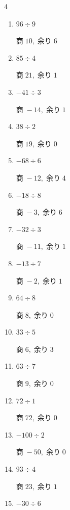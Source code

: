 \begin{multicols}{4}
\begin{enumerate}
        $商\; 0,\; 余り\; 2$

  \item $96 \div 9$

        $商\; 10,\; 余り\; 6$

  \item $85 \div 4$

        $商\; 21,\; 余り\; 1$

  \item $-41 \div 3$

        $商\; -14,\; 余り\; 1$

  \item $38 \div 2$

        $商\; 19,\; 余り\; 0$

  \item $-68 \div 6$

        $商\; -12,\; 余り\; 4$

  \item $-18 \div 8$

        $商\; -3,\; 余り\; 6$

  \item $-32 \div 3$

        $商\; -11,\; 余り\; 1$

  \item $-13 \div 7$

        $商\; -2,\; 余り\; 1$

  \item $64 \div 8$

        $商\; 8,\; 余り\; 0$

  \item $33 \div 5$

        $商\; 6,\; 余り\; 3$

\columnbreak %

  \item $63 \div 7$

        $商\; 9,\; 余り\; 0$

  \item $72 \div 1$

        $商\; 72,\; 余り\; 0$

  \item $-100 \div 2$

        $商\; -50,\; 余り\; 0$

  \item $93 \div 4$

        $商\; 23,\; 余り\; 1$

  \item $-30 \div 6$


\end{enumerate}
\end{multicols}

